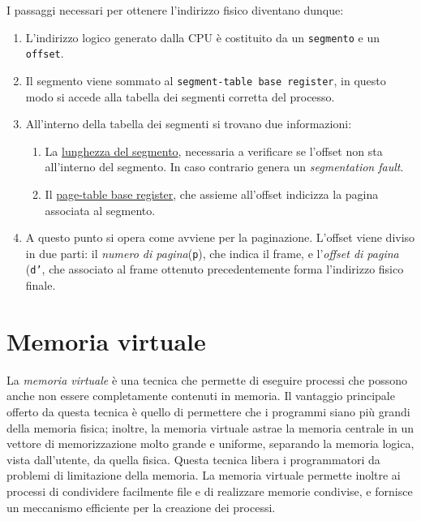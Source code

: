 \documentclass[a4paper,12pt, twoside]{report}
\begin{document}
I passaggi necessari per ottenere l'indirizzo fisico diventano dunque:
\begin{enumerate}
    \item L'indirizzo logico generato dalla CPU \`e costituito da un \texttt{segmento} e un \texttt{offset}.
    \item Il segmento viene sommato al \texttt{segment-table base register}, in questo modo si accede 
        alla tabella dei segmenti corretta del processo. 
    \item All'interno della tabella dei segmenti si trovano due informazioni:
        \begin{enumerate}
            \item La \underline{lunghezza del segmento}, necessaria a verificare se l'offset non sta 
                all'interno del segmento. In caso contrario genera un \emph{segmentation fault}.
            \item Il \underline{page-table base register}, che assieme all'offset indicizza la pagina 
                associata al segmento. 
        \end{enumerate} 
    \item A questo punto si opera come avviene per la paginazione. L'offset viene diviso in due parti:
        il \emph{numero di pagina}(\texttt{p}), che indica il frame, e l'\emph{offset di pagina} 
        (\texttt{d'}, che associato al frame ottenuto precedentemente forma l'indirizzo fisico finale. 
\end{enumerate}

\chapter{Memoria virtuale}

La \emph{memoria virtuale} \`e una tecnica che permette di eseguire processi che possono anche non essere
completamente contenuti in memoria. Il vantaggio principale offerto da questa tecnica \`e quello di 
permettere che i programmi siano pi\`u grandi della memoria fisica; inoltre, la memoria virtuale astrae 
la memoria centrale in un vettore di memorizzazione molto grande e uniforme, separando la memoria logica, 
vista dall'utente, da quella fisica. Questa tecnica libera i programmatori da problemi di limitazione 
della memoria. La memoria virtuale permette inoltre ai processi di condividere facilmente file e di 
realizzare memorie condivise, e fornisce un meccanismo efficiente per la creazione dei processi. 
\end{document}
